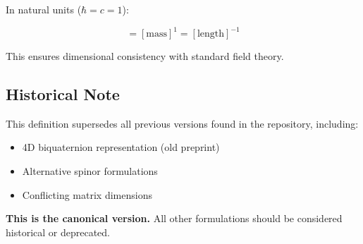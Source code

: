 In natural units ($\hbar = c = 1$):

\begin{equation}
[\Theta] = [\text{mass}]^1 = [\text{length}]^{-1}
\end{equation}

This ensures dimensional consistency with standard field theory.

\subsection{Historical Note}

This definition supersedes all previous versions found in the repository, including:
\begin{itemize}
    \item 4D biquaternion representation (old preprint)
    \item Alternative spinor formulations
    \item Conflicting matrix dimensions
\end{itemize}

\textbf{This is the canonical version.} All other formulations should be considered historical or deprecated.

